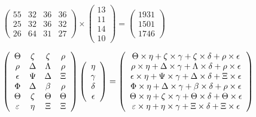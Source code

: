 \documentclass[12pt]{article}
\begin{document}
 
 
\noindent{}
 
 

 
$\left( \begin{array}{ccccccccccccccc}
          55  & 
          32  & 
          36  & 
          36  \\ 
          25  & 
          32  & 
          36  & 
          32  \\ 
          26  & 
          64  & 
          31  & 
          27
\end{array}\right) \times
\left( \begin{array}{c}
          13  \\ 
          11  \\ 
          14  \\ 
          10
\end{array}\right)  =
\left( \begin{array}{c}
        1931  \\ 
        1501  \\ 
        1746
\end{array}\right)  $
 
$  %
 \left( \begin{array}
 {
 c
 c
 c
 c
 }
 \Theta & 
                    \zeta & 
                    \zeta & 
 \rho \\ 
 \rho & 
 \Delta & 
 \Lambda & 
 \rho \\ 
 \epsilon & 
 \Psi & 
 \Delta & 
                    \Xi \\ 
 \Phi & 
 \Delta & 
 \beta & 
 \rho \\ 
 \Theta & 
                    \zeta & 
 \Theta & 
 \Theta \\ 
 \varepsilon & 
 \eta & 
                    \Xi & 
                    \Xi
 \end{array} \right)
 \left( \begin{array}
 {
 c
 }
 \eta \\ 
 \gamma \\ 
 \delta \\ 
 \epsilon
 \end{array} \right)
=
 \left( \begin{array}
 {
 c
 }
  \Theta \times  \eta +                     \zeta \times  \gamma +                     \zeta \times  \delta +  \rho \times  \epsilon \\ 
  \rho \times  \eta +  \Delta \times  \gamma +  \Lambda \times  \delta +  \rho \times  \epsilon \\ 
  \epsilon \times  \eta +  \Psi \times  \gamma +  \Delta \times  \delta +                     \Xi \times  \epsilon \\ 
  \Phi \times  \eta +  \Delta \times  \gamma +  \beta \times  \delta +  \rho \times  \epsilon \\ 
  \Theta \times  \eta +                     \zeta \times  \gamma +  \Theta \times  \delta +  \Theta \times  \epsilon \\ 
  \varepsilon \times  \eta +  \eta \times  \gamma +                     \Xi \times  \delta +                     \Xi \times  \epsilon
 \end{array} \right)
$
 
\end{document}

